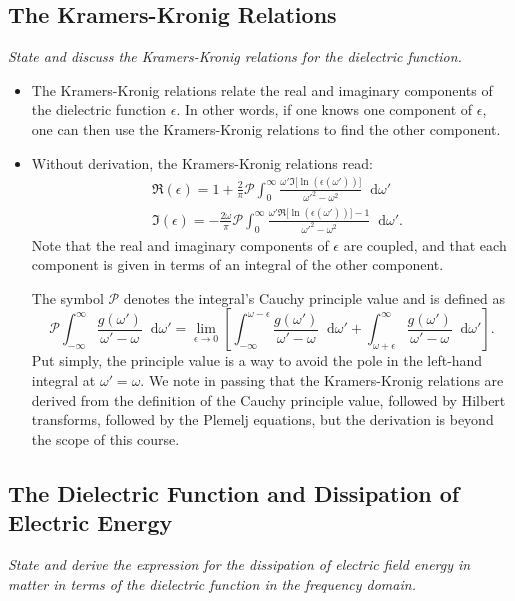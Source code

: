\documentclass[11pt, a4paper]{article}
\newcommand{\diff}{\mathop{}\!\mathrm{d}} %
\begin{document}
    
\subsection{The Kramers-Kronig Relations}
\textit{State and discuss the Kramers-Kronig relations for the dielectric function.}
\begin{itemize}
    \item The Kramers-Kronig relations relate the real and imaginary components of the dielectric function $ \epsilon $. In other words, if one knows one component of $ \epsilon $, one can then use the Kramers-Kronig relations to find the other component.

    \item Without derivation, the Kramers-Kronig relations read:
    \begin{align*}
        & \Re(\epsilon) = 1 + \frac{2}{\pi} \mathcal{P} \int_{0}^{\infty} \frac{\omega' \Im \big[ \ln(\epsilon(\omega')) \big]}{\omega'^{2} - \omega^{2}} \diff \omega'\\
        & \Im(\epsilon) = - \frac{2\omega}{\pi} \mathcal{P} \int_{0}^{\infty} \frac{\omega' \Re \big[ \ln(\epsilon(\omega'))  \big]- 1}{\omega'^{2} - \omega^{2}} \diff \omega'.
    \end{align*}
    Note that the real and imaginary components of $ \epsilon $ are coupled, and that each component is given in terms of an integral of the other component.

    The symbol $ \mathcal{P} $ denotes the integral's Cauchy principle value and is defined as 
    \begin{equation*}
        \mathcal{P}\int_{-\infty}^{\infty} \frac{g(\omega')}{\omega' - \omega} \diff \omega' = \lim_{\epsilon \to 0} \left[ \int_{-\infty}^{\omega-\epsilon} \frac{g(\omega')}{\omega'-\omega}\diff \omega' + \int_{\omega+\epsilon}^{\infty} \frac{g(\omega')}{\omega'-\omega}\diff \omega' \right].
    \end{equation*}
    Put simply, the principle value is a way to avoid the pole in the left-hand integral at $ \omega' = \omega $. We note in passing that the Kramers-Kronig relations are derived from the definition of the Cauchy principle value, followed by Hilbert transforms, followed by the Plemelj equations, but the derivation is beyond the scope of this course.

\end{itemize}

    
\subsection{The Dielectric Function and Dissipation of Electric Energy}
\textit{State and derive the expression for the dissipation of electric field energy in matter in terms of the dielectric function in the frequency domain.}
\end{document}
